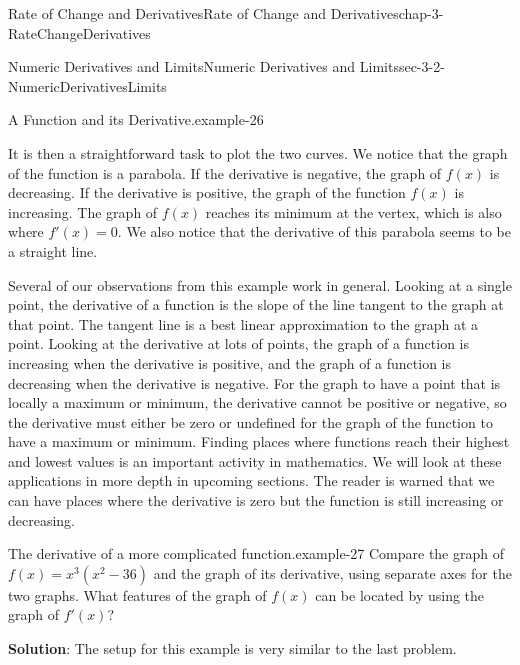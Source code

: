 \documentclass[oneside,10pt,]{book}
\newcommand{\terminology}[1]{\textbf{#1}}
\numberwithin{equation}{section}
\begin{document}
\begin{chapterptx}{Rate of Change and Derivatives}{}{Rate of Change and Derivatives}{}{}{chap-3-RateChangeDerivatives}
\begin{sectionptx}{Numeric Derivatives and Limits}{}{Numeric Derivatives and Limits}{}{}{sec-3-2-NumericDerivativesLimits}
\begin{example}{A Function and its Derivative.}{example-26}
\begin{sidebyside}{1}{0.05}{0.05}{0}
\begin{sbspanel}{0.9}
\end{sbspanel}%
\end{sidebyside}%
\par
\hypertarget{p-1039}{}%
It is then a straightforward task to plot the two curves.  We notice that the graph of the function is a parabola.  If the derivative is negative, the graph of \(f(x)\) is decreasing.  If the derivative is positive, the graph of the function \(f(x)\) is increasing.  The graph of \(f(x)\) reaches its minimum at the vertex, which is also where \(f'(x)=0\).  We also notice that the derivative of this parabola seems to be a straight line.%
\end{example}
\hypertarget{p-1040}{}%
Several of our observations from this example work in general.  Looking at a single point, the derivative of a function is the slope of the line tangent to the graph at that point.  The tangent line is a best linear approximation to the graph at a point.  Looking at the derivative at lots of points, the graph of a function is increasing when the derivative is positive, and the graph of a function is decreasing when the derivative is negative.  For the graph to have a point that is locally a maximum or minimum, the derivative cannot be positive or negative, so the derivative must either be zero or undefined for the graph of the function to have a maximum or minimum.  Finding places where functions reach their highest and lowest values is an important activity in mathematics.  We will look at these applications in more depth in upcoming sections.  The reader is warned that we can have places where the derivative is zero but the function is still increasing or decreasing.%
\begin{example}{The derivative of a more complicated function.}{example-27}%
\hypertarget{p-1041}{}%
Compare the graph of \(f(x)=x^3 (x^2-36)\) and the graph of its derivative, using separate axes for the two graphs.  What features of the graph of \(f(x)\) can be located by using the graph of \(f'(x)\)?%
\par
\hypertarget{p-1042}{}%
\terminology{Solution}: The setup for this example is very similar to the last problem.%
\begin{sidebyside}{1}{0}{0}{0}%
\begin{sbspanel}{1}%

\end{sbspanel}
\end{sidebyside}
\end{example}
\end{sectionptx}
\end{chapterptx}
\end{document}
